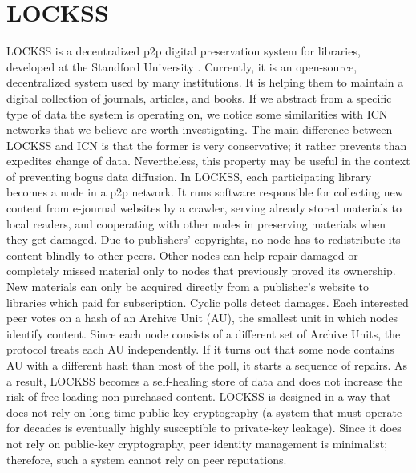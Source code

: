 \section{LOCKSS}
LOCKSS is a decentralized p2p digital preservation system for libraries, developed at the Standford University \cite{maniatis2003preserving}. Currently, it is an open-source, decentralized system used by many institutions. It is helping them to maintain a digital collection of journals, articles, and books. If we abstract from a specific type of data the system is operating on, we notice some similarities with ICN networks that we believe are worth investigating. The main difference between LOCKSS and ICN is that the former is very conservative; it rather prevents than expedites change of data. Nevertheless, this property may be useful in the context of preventing bogus data diffusion. 
In LOCKSS, each participating library becomes a node in a p2p network. It runs software responsible for collecting new content from e-journal websites by a crawler, serving already stored materials to local readers, and cooperating with other nodes in preserving materials when they get damaged. 
Due to publishers' copyrights, no node has to redistribute its content blindly to other peers. Other nodes can help repair damaged or completely missed material only to nodes that previously proved its ownership. New materials can only be acquired directly from a publisher's website to libraries which paid for subscription. 
Cyclic polls detect damages. Each interested peer votes on a hash of an Archive Unit (AU), the smallest unit in which nodes identify content. Since each node consists of a different set of Archive Units, the protocol treats each AU independently. If it turns out that some node contains AU with a different hash than most of the poll, it starts a sequence of repairs. As a result, LOCKSS becomes a self-healing store of data and does not increase the risk of free-loading non-purchased content.
LOCKSS is designed in a way that does not rely on long-time public-key cryptography (a system that must operate for decades is eventually highly susceptible to private-key leakage). Since it does not rely on public-key cryptography, peer identity management is minimalist; therefore, such a system cannot rely on peer reputations.

